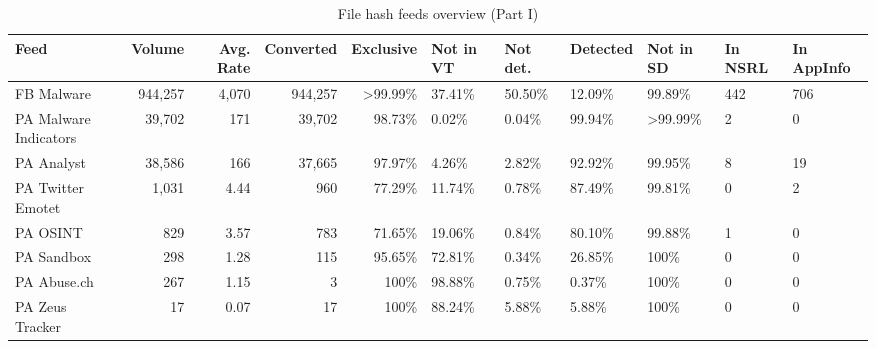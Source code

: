 \begin{table*}[htt]
\footnotesize \tabcolsep=0.11cm
\caption{File hash feeds overview (Part I)}
\centering
\small
\begin{tabular}{l | r r r r H H H H H H }
\toprule
 Feed         &   Volume  &  Avg. Rate  & Converted &   Exclusive  &   Not in VT    &  Not det.  &   Detected   &   Not in SD &   In NSRL   &  In AppInfo  \\
\midrule
 FB Malware              &    944,257  &  4,070    & 944,257   &    >99.99\%    &     37.41\%    &    50.50\%      &     12.09\%          &    99.89\% &     442 &             706 \\
 PA Malware Indicators   &    39,702   &  171      & 39,702    &     98.73\%    &      0.02\%    &     0.04\%      &     99.94\%          &   >99.99\% &       2 &             0  \\
 PA Analyst              &    38,586   &  166      & 37,665    &     97.97\%    &      4.26\%    &     2.82\%      &     92.92\%          &    99.95\% &       8 &             19 \\
 PA Twitter Emotet       &    1,031    &  4.44     & 960       &     77.29\%    &     11.74\%    &     0.78\%      &     87.49\%          &    99.81\% &       0 &             2  \\
 PA OSINT                &    829      &  3.57     & 783       &     71.65\%    &     19.06\%    &     0.84\%      &     80.10\%          &    99.88\% &       1 &             0  \\
 PA Sandbox              &    298      &  1.28     & 115       &     95.65\%    &     72.81\%    &     0.34\%      &     26.85\%          &    100\% &         0 &             0  \\
 PA Abuse.ch             &    267      &  1.15     & 3         &       100\%    &     98.88\%    &     0.75\%      &      0.37\%          &    100\% &         0 &             0  \\
 PA Zeus Tracker         &    17       &  0.07     & 17        &       100\%    &     88.24\%    &     5.88\%      &      5.88\%          &    100\% &         0 &             0  \\
\bottomrule
\end{tabular}
\label{tab:md5-volume-1}
\end{table*}


